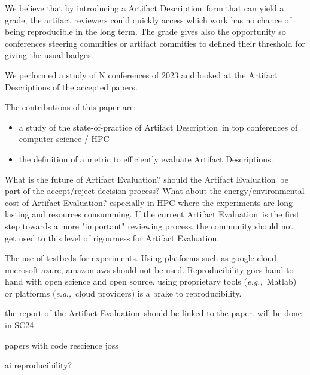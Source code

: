 \documentclass[sigconf,natbib=false]{acmart}
\newcommand{\eg}{\emph{e.g.,}}
\newcommand{\ad}{Artifact Description}
\newcommand{\aeval}{Artifact Evaluation}
\begin{document}
We believe that by introducing a \ad\ form that can yield a grade, the artifact reviewers could quickly access which work has no chance of being reproducible in the long term.
The grade gives also the opportunity so conferences steering commities or artifact commities to defined their threshold for giving the usual badges.


We performed a study of N conferences of 2023 and looked at the \ad s of the accepted papers.

The contributions of this paper are:
\begin{itemize}
  \item a study of the state-of-practice of \ad\ in top conferences of computer science / HPC
  \item the definition of a metric to efficiently evaluate \ad s.
\end{itemize}


What is the future of \aeval?
should the \aeval\ be part of the accept/reject decision process?
What about the energy/environmental cost of \aeval?
especially in HPC where the experiments are long lasting and resources consumming.
If the current \aeval\ is the first step towards a more "important" reviewing process, the community should not get used to this level of rigourness for \aeval.


The use of testbeds for experiments.
Using platforms such as google cloud, microsoft azure, amazon aws should not be used.
Reproducibility goes hand to hand with open science and open source.
using proprietary tools (\eg\ Matlab) or platforms (\eg\ cloud providers) is a brake to reproducibility.


the report of the \aeval\ should be linked to the paper.
will be done in SC24

papers with code
rescience
joss

ai reproducibility?




%
%
\printbibliography
\end{document}
